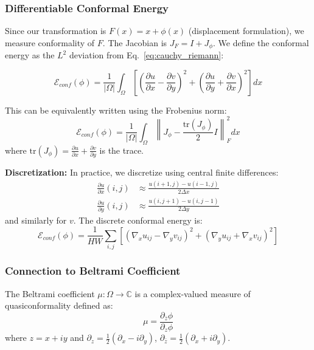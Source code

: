 \subsubsection{Differentiable Conformal Energy}

Since our transformation is $F(x) = x + \phi(x)$ (displacement formulation), we measure conformality of $F$. The Jacobian is $J_F = I + J_\phi$. We define the conformal energy as the $L^2$ deviation from Eq.~\eqref{eq:cauchy_riemann}:

\begin{equation}
\mathcal{E}_{conf}(\phi) = \frac{1}{|\Omega|} \int_\Omega \left[ \left( \frac{\partial u}{\partial x} - \frac{\partial v}{\partial y} \right)^2 + \left( \frac{\partial u}{\partial y} + \frac{\partial v}{\partial x} \right)^2 \right] dx
\label{eq:conformal_energy}
\end{equation}

This can be equivalently written using the Frobenius norm:
\begin{equation}
\mathcal{E}_{conf}(\phi) = \frac{1}{|\Omega|} \int_\Omega \left\| J_\phi - \frac{\text{tr}(J_\phi)}{2} I \right\|_F^2 dx
\end{equation}
where $\text{tr}(J_\phi) = \frac{\partial u}{\partial x} + \frac{\partial v}{\partial y}$ is the trace.

\textbf{Discretization:} In practice, we discretize using central finite differences:
\begin{align}
\frac{\partial u}{\partial x}(i,j) &\approx \frac{u(i+1,j) - u(i-1,j)}{2\Delta x} \\
\frac{\partial u}{\partial y}(i,j) &\approx \frac{u(i,j+1) - u(i,j-1)}{2\Delta y}
\end{align}
and similarly for $v$. The discrete conformal energy is:
\begin{equation}
\mathcal{E}_{conf}(\phi) = \frac{1}{HW} \sum_{i,j} \left[ \left( \nabla_x u_{ij} - \nabla_y v_{ij} \right)^2 + \left( \nabla_y u_{ij} + \nabla_x v_{ij} \right)^2 \right]
\label{eq:discrete_conformal}
\end{equation}

\subsubsection{Connection to Beltrami Coefficient}

The Beltrami coefficient $\mu: \Omega \rightarrow \mathbb{C}$ is a complex-valued measure of quasiconformality defined as:
\begin{equation}
\mu = \frac{\partial_{\bar{z}} \phi}{\partial_z \phi}
\end{equation}
where $z = x + iy$ and $\partial_z = \frac{1}{2}(\partial_x - i\partial_y)$, $\partial_{\bar{z}} = \frac{1}{2}(\partial_x + i\partial_y)$.

